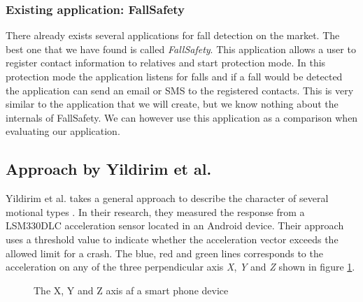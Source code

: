 \documentclass[12pt, a4paper, onecolumn]{article}
\begin{document}
	\subsubsection{Existing application: FallSafety}
	
	There already exists several applications for fall detection on the market. The best one that we have found is called \textit{FallSafety}. This application allows a user to register contact information to relatives and start protection mode. In this protection mode the application listens for falls and if a fall would be detected the application can send an email or SMS to the registered contacts. This is very similar to the application that we will create, but we know nothing about the internals of FallSafety. We can however use this application as a comparison when evaluating our application.
	
	\subsection{Approach by Yildirim et al.}
	Yildirim et al. takes a general approach to describe the character of several motional types \cite{int_journ}. In their research, they measured the response from a LSM330DLC acceleration sensor located in an Android device. Their approach uses a threshold value to indicate whether the acceleration vector exceeds the allowed limit for a crash. The blue, red and green lines corresponds to the acceleration on any of the three perpendicular axis \textit{X}, \textit{Y} and \textit{Z} shown in figure \ref{fig:XYZ-Axis}.
	
	\begin{figure}[H]
		\centering
		\caption{The X, Y and Z axis af a smart phone device}%
		\label{fig:XYZ-Axis}%
	\end{figure}
	
\end{document}
